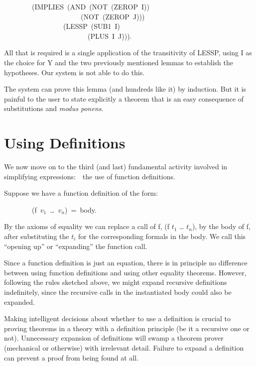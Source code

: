 \documentclass[10pt]{book}
\newenvironment{pubasis}{\begin{flushleft}}{\end{flushleft}}
\begin{document}
\begin{pubasis}
~~~~~~~~(IMPLIES~(AND~(NOT~(ZEROP~I))\\
~~~~~~~~~~~~~~~~~~~~~~(NOT~(ZEROP~J)))\\
~~~~~~~~~~~~~~~~~(LESSP~(SUB1~I)\\
~~~~~~~~~~~~~~~~~~~~~~~~(PLUS~I~J))).\\
\end{pubasis}
All that is required is  a single application of the transitivity of LESSP,
using I as the  choice for Y and the two previously mentioned
lemmas to establish the hypotheses.  Our system is not able to do this.

The system can prove this lemma (and hundreds like it)
by induction.  But it is painful to the
user to state explicitly a theorem that is
an easy consequence of substitutions and \emph{modus ponens}.
\chapter{Using Definitions}
\pagestyle{headings}
\label{SECDEFINITIONS}
We now move on to the third (and last) fundamental activity involved in
simplifying expressions:~~the use of function definitions.

Suppose we have a function definition of the form:

\begin{pubasis}
~~~~~~~~(f~$v_{1}$~\ldots{}~$v_{n}$)~=~body.\\
\end{pubasis}
By the axioms of equality we can replace a call of f, (f $t_{1}$ \ldots{} $t_{n}$),
by the body of f, after substituting the $t_{i}$ for the corresponding
formals in the body.  We call this ``opening up'' or ``expanding'' the
function call.

Since a function definition is just
an equation, there is in principle no difference between using function
definitions and using other equality theorems.  However,  following the rules
sketched above, we might expand recursive definitions indefinitely,
since the recursive calls in the instantiated body could also
be expanded.

Making  intelligent decisions about whether to use a definition
is crucial to proving theorems in a theory with a definition
principle (be it a recursive one or not).  Unnecessary expansion of definitions
will swamp a theorem prover (mechanical or otherwise) with irrelevant
detail.  Failure to expand a
definition can prevent a proof from being found at all.
\end{document}
